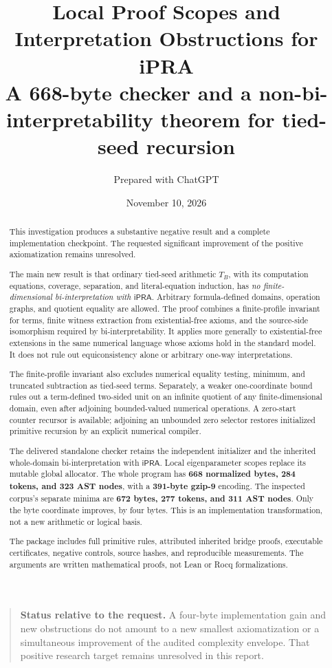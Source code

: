 \documentclass[11pt,letterpaper]{article}
\title{\color{ink}\textbf{Local Proof Scopes and Interpretation Obstructions for iPRA}\\[.5em]
\large A 668-byte checker and a non-bi-interpretability theorem for tied-seed recursion}
\author{Prepared with ChatGPT}
\date{November 10, 2026}
\theoremstyle{definition}\newtheorem{definition}[theorem]{Definition}
\theoremstyle{remark}\newtheorem{remark}[theorem]{Remark}
\newcommand{\ipra}{\ensuremath{\mathsf{iPRA}}}
\begin{document}
\maketitle
\begin{abstract}
This investigation produces a substantive negative result and a complete
implementation checkpoint. The requested significant improvement of the
positive axiomatization remains unresolved.

The main new result is that ordinary tied-seed arithmetic $T_B$, with
its computation equations, coverage, separation, and literal-equation
induction, has \emph{no finite-dimensional bi-interpretation with
\ipra}. Arbitrary formula-defined domains, operation graphs, and quotient
equality are allowed. The proof combines a finite-profile invariant for
terms, finite witness extraction from existential-free axioms, and the
source-side isomorphism required by bi-interpretability. It applies more
generally to existential-free extensions in the same numerical language
whose axioms hold in the standard model. It does not rule out equiconsistency alone or
arbitrary one-way interpretations.

The finite-profile invariant also excludes numerical equality testing,
minimum, and truncated subtraction as tied-seed terms. Separately, a
weaker one-coordinate bound rules out a term-defined two-sided unit on
an infinite quotient of any finite-dimensional domain, even after
adjoining bounded-valued numerical operations. A zero-start counter
recursor is available; adjoining an unbounded zero selector restores
initialized primitive recursion by an explicit numerical compiler.

The delivered standalone checker retains the independent initializer
and the inherited whole-domain bi-interpretation with \ipra. Local
eigenparameter scopes replace its mutable global allocator. The whole
program has \textbf{668 normalized bytes, 284 tokens, and 323 AST nodes},
with a \textbf{391-byte gzip-9} encoding. The inspected corpus's separate
minima are \textbf{672 bytes, 277 tokens, and 311 AST nodes}. Only the
byte coordinate improves, by four bytes. This is an implementation
transformation, not a new arithmetic or logical basis.

The package includes full primitive rules, attributed inherited bridge
proofs, executable certificates, negative controls, source hashes, and
reproducible measurements. The arguments are written mathematical proofs,
not Lean or Rocq formalizations.
\end{abstract}
\begin{quote}
\textbf{Status relative to the request.} A four-byte implementation gain
and new obstructions do not amount to a new smallest axiomatization or
a simultaneous improvement of the audited complexity envelope. That
positive research target remains unresolved in this report.
\end{quote}
\clearpage
\setcounter{tocdepth}{1}\tableofcontents
\clearpage
\end{document}
